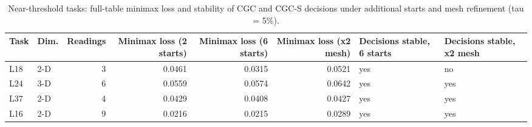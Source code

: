 \begin{table}[t]
\centering\small
\caption{Near-threshold tasks: full-table minimax loss and stability of CGC and CGC-S decisions under additional starts and mesh refinement (tau = 5\%).}
\label{tab:tab_near_threshold}
\begin{tabular}{llrrrrll}
\toprule
Task & Dim. & Readings & Minimax loss (2 starts) & Minimax loss (6 starts) & Minimax loss (x2 mesh) & Decisions stable, 6 starts & Decisions stable, x2 mesh \\
\midrule
L18 & 2-D & 3 & 0.0461 & 0.0315 & 0.0521 & yes & no \\
L24 & 3-D & 6 & 0.0559 & 0.0574 & 0.0642 & yes & yes \\
L37 & 2-D & 4 & 0.0429 & 0.0408 & 0.0427 & yes & yes \\
L16 & 2-D & 9 & 0.0216 & 0.0215 & 0.0289 & yes & yes \\
\bottomrule
\end{tabular}
\end{table}
